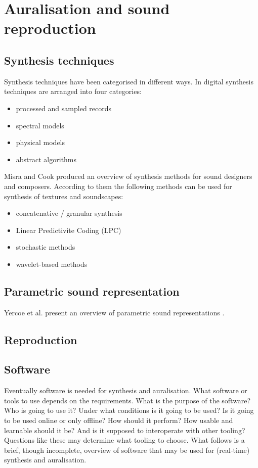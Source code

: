 \section{Auralisation and sound reproduction}

\subsection{Synthesis techniques}
Synthesis techniques have been categorised in different ways. In \cite{JuliusO.Smith} digital synthesis techniques are arranged into four categories:
\begin{itemize}
 \item processed and sampled records
 \item spectral models
 \item physical models
 \item abstract algorithms
\end{itemize}

Misra and Cook produced an overview of synthesis methods for sound designers and 
composers.
According to them the following methods can be used for synthesis of textures 
and soundscapes:
\begin{itemize}
 \item concatenative / granular synthesis
 \item Linear Predictivite Coding (LPC)
 \item stochastic methods
 \item wavelet-based methods
\end{itemize}


\subsection{Parametric sound representation}
Yercoe et al. present an overview of parametric sound representations \cite{Vercoe1998}.

\subsection{Reproduction}


\subsection{Software}\label{sec:theory:auralisation:software}
Eventually software is needed for synthesis and auralisation. What software or
tools to use depends on the requirements. What is the purpose of the software?
Who is going to use it? Under what conditions is it going to be used? Is it
going to be used online or only offline? How should it perform? How usable and
learnable should it be? And is it supposed to interoperate with other tooling?
Questions like these may determine what tooling to choose. What follows is a
brief, though incomplete, overview of software that may be used for (real-time)
synthesis and auralisation.

